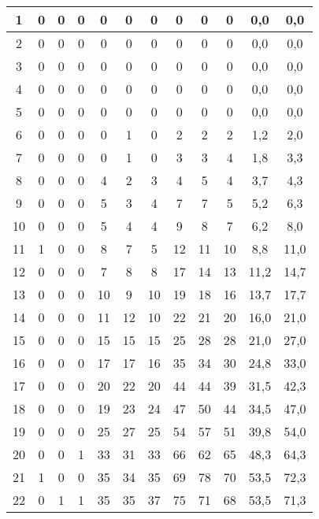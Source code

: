 \begin{center}
\begin{longtable}{|c|c|c|c|c|c|c|c|c|c|c|c|}
		\hline \hline
		\endlastfoot
		
		1  & 0 & 0 & 0 & 0  & 0  & 0  & 0   & 0   & 0   & 0,0      & 0,0    \\ \hline
		2  & 0 & 0 & 0 & 0  & 0  & 0  & 0   & 0   & 0   & 0,0      & 0,0    \\ \hline
		3  & 0 & 0 & 0 & 0  & 0  & 0  & 0   & 0   & 0   & 0,0      & 0,0    \\ \hline
		4  & 0 & 0 & 0 & 0  & 0  & 0  & 0   & 0   & 0   & 0,0      & 0,0    \\ \hline
		5  & 0 & 0 & 0 & 0  & 0  & 0  & 0   & 0   & 0   & 0,0      & 0,0    \\ \hline
		6  & 0 & 0 & 0 & 0  & 1  & 0  & 2   & 2   & 2   & 1,2      & 2,0    \\ \hline
		7  & 0 & 0 & 0 & 0  & 1  & 0  & 3   & 3   & 4   & 1,8      & 3,3    \\ \hline
		8  & 0 & 0 & 0 & 4  & 2  & 3  & 4   & 5   & 4   & 3,7      & 4,3    \\ \hline
		9  & 0 & 0 & 0 & 5  & 3  & 4  & 7   & 7   & 5   & 5,2      & 6,3    \\ \hline
		10 & 0 & 0 & 0 & 5  & 4  & 4  & 9   & 8   & 7   & 6,2      & 8,0    \\ \hline
		11 & 1 & 0 & 0 & 8  & 7  & 5  & 12  & 11  & 10  & 8,8      & 11,0   \\ \hline
		12 & 0 & 0 & 0 & 7  & 8  & 8  & 17  & 14  & 13  & 11,2     & 14,7   \\ \hline
		13 & 0 & 0 & 0 & 10 & 9  & 10 & 19  & 18  & 16  & 13,7     & 17,7   \\ \hline
		14 & 0 & 0 & 0 & 11 & 12 & 10 & 22  & 21  & 20  & 16,0     & 21,0   \\ \hline
		15 & 0 & 0 & 0 & 15 & 15 & 15 & 25  & 28  & 28  & 21,0     & 27,0   \\ \hline
		16 & 0 & 0 & 0 & 17 & 17 & 16 & 35  & 34  & 30  & 24,8     & 33,0   \\ \hline
		17 & 0 & 0 & 0 & 20 & 22 & 20 & 44  & 44  & 39  & 31,5     & 42,3   \\ \hline
		18 & 0 & 0 & 0 & 19 & 23 & 24 & 47  & 50  & 44  & 34,5     & 47,0   \\ \hline
		19 & 0 & 0 & 0 & 25 & 27 & 25 & 54  & 57  & 51  & 39,8     & 54,0   \\ \hline
		20 & 0 & 0 & 1 & 33 & 31 & 33 & 66  & 62  & 65  & 48,3     & 64,3   \\ \hline
		21 & 1 & 0 & 0 & 35 & 34 & 35 & 69  & 78  & 70  & 53,5     & 72,3   \\ \hline
		22 & 0 & 1 & 1 & 35 & 35 & 37 & 75  & 71  & 68  & 53,5     & 71,3   \\ \hline

\end{longtable}
\end{center}
